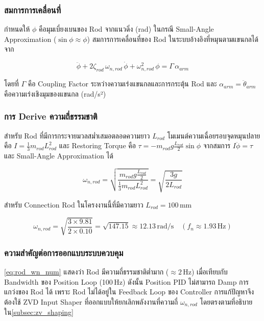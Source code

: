 \subsubsection{สมการการเคลื่อนที่}
 
กำหนดให้ $\phi$ คือมุมเบี่ยงเบนของ Rod จากแนวดิ่ง (rad)
ในกรณี Small-Angle Approximation ($\sin\phi \approx \phi$)
สมการการเคลื่อนที่ของ Rod ในระบบอ้างอิงที่หมุนตามแขนกลได้จาก
 
\begin{equation}
    \ddot{\phi} + 2\zeta_{rod}\,\omega_{n,rod}\,\dot{\phi}
    + \omega_{n,rod}^2\,\phi = \Gamma\,\alpha_{arm}
    \label{eq:rod_eom}
\end{equation}
 
\noindent โดยที่ $\Gamma$ คือ Coupling Factor ระหว่างความเร่งแขนกลและการกระตุ้น Rod
และ $\alpha_{arm} = \ddot{\theta}_{arm}$ คือความเร่งเชิงมุมของแขนกล (rad/s²)
 
\subsubsection{การ Derive ความถี่ธรรมชาติ}
 
สำหรับ Rod ที่มีการกระจายมวลสม่ำเสมอตลอดความยาว $L_{rod}$
โมเมนต์ความเฉื่อยรอบจุดหมุนปลายคือ $I = \tfrac{1}{3}m_{rod}L_{rod}^2$
และ Restoring Torque คือ $\tau = -m_{rod}g\tfrac{L_{rod}}{2}\sin\phi$
จากสมการ $I\ddot{\phi} = \tau$ และ Small-Angle Approximation ได้
 
\begin{equation}
    \omega_{n,rod} = \sqrt{\frac{m_{rod}g\tfrac{L_{rod}}{2}}{\tfrac{1}{3}m_{rod}L_{rod}^2}}
                  = \sqrt{\frac{3g}{2L_{rod}}}
    \label{eq:rod_natural_freq}
\end{equation}
 
\noindent สำหรับ Connection Rod ในโครงงานนี้ที่มีความยาว $L_{rod} = 100$\,mm
 
\begin{equation}
    \omega_{n,rod} = \sqrt{\frac{3 \times 9.81}{2 \times 0.10}}
                  = \sqrt{147.15}
                  \approx 12.13\,\text{rad/s}
                  \quad (f_n \approx 1.93\,\text{Hz})
    \label{eq:rod_wn_num}
\end{equation}
 
\subsubsection{ความสำคัญต่อการออกแบบระบบควบคุม}
 
\cref{eq:rod_wn_num} แสดงว่า Rod มีความถี่ธรรมชาติต่ำมาก ($\approx 2$\,Hz)
เมื่อเทียบกับ Bandwidth ของ Position Loop (100\,Hz)
ดังนั้น Position PID ไม่สามารถ Damp การแกว่งของ Rod ได้
เพราะ Rod ไม่ได้อยู่ใน Feedback Loop ของ Controller
การแก้ปัญหาจึงต้องใช้ ZVD Input Shaper ที่ออกแบบให้ยกเลิกพลังงานที่ความถี่
$\omega_{n,rod}$ โดยตรงตามที่อธิบายใน\cref{subsec:zv_shaping}
\label{sec:trajectory}

